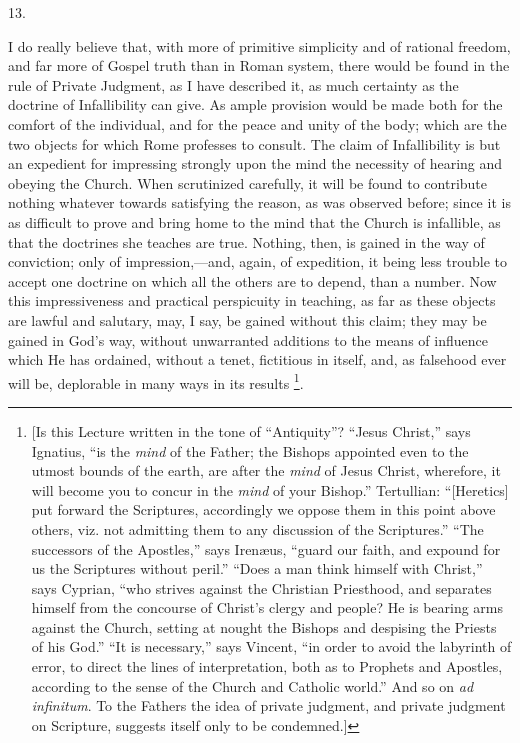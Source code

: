 13.

I do really believe that, with more of primitive simplicity and of
rational freedom, and far more of Gospel truth than in Roman system,
there would be found in the rule of Private Judgment, as I have
described it, as much certainty as the doctrine of Infallibility can
give. As ample provision would be made both for the comfort of the
individual, and for the peace and unity of the body; which are the two
objects for which Rome professes to consult. The claim of
Infallibility is but an expedient for impressing strongly upon the
mind the necessity of hearing and obeying the Church. When scrutinized
carefully, it will be found to contribute nothing whatever towards
satisfying the reason, as was observed before; since it is as
difficult to prove and bring home to the mind that the Church is
infallible, as that the doctrines she teaches are true. Nothing, then,
is gained in the way of conviction; only of impression,—and, again,
of expedition, it being less trouble to accept one doctrine on which
all the others are to depend, than a number. Now this
impressiveness and practical perspicuity in teaching, as far as these
objects are lawful and salutary, may, I say, be gained without this
claim; they may be gained in God's way, without unwarranted additions
to the means of influence which He has ordained, without a tenet,
fictitious in itself, and, as falsehood ever will be, deplorable in
many ways in its results \footnote{[Is this Lecture written in the tone of
``Antiquity''? ``Jesus Christ,'' says Ignatius,
``is the \emph{mind} of the Father; the Bishops appointed even to
the utmost bounds of the earth, are after the \emph{mind} of Jesus
Christ, wherefore, it will become you to concur in the \emph{mind} of
your Bishop.'' Tertullian: ``[Heretics] put forward the
Scriptures, accordingly we oppose them in this point above others,
viz. not admitting them to any discussion of the Scriptures.''
``The successors of the Apostles,'' says Irenæus, ``guard
our faith, and expound for us the Scriptures without peril.''
``Does a man think himself with Christ,'' says Cyprian,
``who strives against the Christian Priesthood, and separates
himself from the concourse of Christ's clergy and people? He is
bearing arms against the Church, setting at nought the Bishops and
despising the Priests of his God.'' ``It is necessary,''
says Vincent, ``in order to avoid the labyrinth of error, to
direct the lines of interpretation, both as to Prophets and Apostles,
according to the sense of the Church and Catholic world.'' And so
on \emph{ad infinitum}. To the Fathers the idea of private judgment,
and private judgment on Scripture, suggests itself only to be
condemned.]}.

